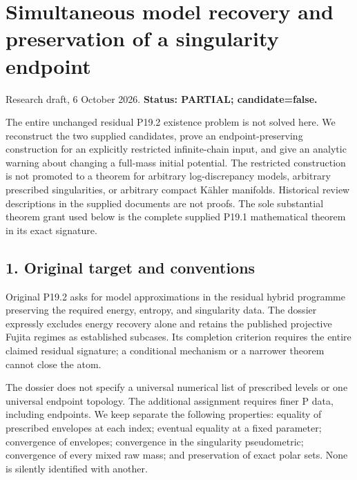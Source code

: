 \documentclass[
  11pt,
]{article}
\author{}
\date{}
\begin{document}
\section{Simultaneous model recovery and preservation of a singularity
endpoint}\label{simultaneous-model-recovery-and-preservation-of-a-singularity-endpoint}

Research draft, 6 October 2026. \textbf{Status: PARTIAL;
candidate=false.}

The entire unchanged residual P19.2 existence problem is not solved
here. We reconstruct the two supplied candidates, prove an
endpoint-preserving construction for an explicitly restricted
infinite-chain input, and give an analytic warning about changing a
full-mass initial potential. The restricted construction is not promoted
to a theorem for arbitrary log-discrepancy models, arbitrary prescribed
singularities, or arbitrary compact Kähler manifolds. Historical review
descriptions in the supplied documents are not proofs. The sole
substantial theorem grant used below is the complete supplied P19.1
mathematical theorem in its exact signature.

\subsection{1. Original target and
conventions}\label{original-target-and-conventions}

Original P19.2 asks for model approximations in the residual hybrid
programme preserving the required energy, entropy, and singularity data.
The dossier expressly excludes energy recovery alone and retains the
published projective Fujita regimes as established subcases. Its
completion criterion requires the entire claimed residual signature; a
conditional mechanism or a narrower theorem cannot close the atom.

The dossier does not specify a universal numerical list of prescribed
levels or one universal endpoint topology. The additional assignment
requires finer P data, including endpoints. We keep separate the
following properties: equality of prescribed envelopes at each index;
eventual equality at a fixed parameter; convergence of envelopes;
convergence in the singularity pseudometric; convergence of every mixed
raw mass; and preservation of exact polar sets. None is silently
identified with another.
\end{document}
